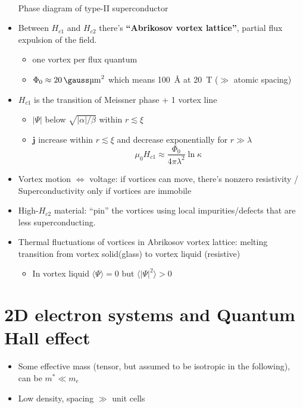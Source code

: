 \documentclass[11pt,letterpaper]{article}
\numberwithin{equation}{section} %
\renewcommand*{\vec}[1]{\bm{#1}}
\begin{document}
\begin{itemize}
\begin{center}
\\
Phase diagram of type-II superconductor
\end{center}
	\item Between $H_{c1}$ and $H_{c2}$ there's \textbf{``Abrikosov vortex
		lattice''}, partial flux expulsion of the field. 
		\begin{itemize}
		  \item one vortex per flux quantum
		  \item $\Phi_0 \approx \SI{20}{\gauss\micro\meter\squared}$ which
			  means \SI{100}{\angstrom} at \SI{20}{T} ($\gg$ atomic spacing) 
		\end{itemize}
	\item $H_{c1}$ is the transition of Meissner phase + 1 vortex line
		\begin{itemize}
			\item $|\Psi|$ below $\sqrt{|\alpha|/\beta}$ within
				$r\lesssim\xi$
			\item $\vec j$ increase within $r\lesssim\xi$ and decrease
				exponentially for $r\gg\lambda$
				\begin{equation}
					\mu_0H_{c1} \approx \frac{\Phi_0}{4\pi\lambda^2}\ln\kappa
				\end{equation}
		\end{itemize}
	\item Vortex motion $\Leftrightarrow$ voltage: if vortices can move,
		there's nonzero resistivity / Superconductivity only if vortices are
		immobile
	\item High-$H_{c2}$ material: ``pin'' the vortices using local
		impurities/defects that are less superconducting. 
	\item Thermal fluctuations of vortices in Abrikosov vortex lattice:
		melting transition from vortex solid(glass) to vortex liquid (resistive)
		\begin{itemize}
		  \item In vortex liquid $\langle\Psi\rangle = 0$ but $\langle
				  |\Psi|^2\rangle > 0$
		\end{itemize}
\end{itemize}

\section{2D electron systems and Quantum Hall effect}
\label{sec:2d_electron_systems_and_quantum_hall_effect}
\begin{itemize}
	\item Some effective mass (tensor, but assumed to be isotropic in the
		following), can be $m^* \ll m_e$
	\item Low density, spacing $\gg$ unit cells
\end{itemize}
\end{document}
